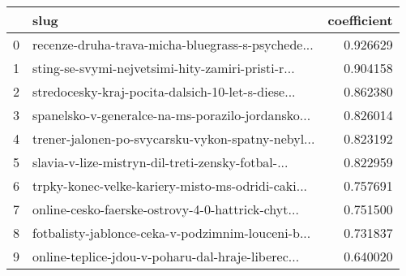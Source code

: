 \begin{tabular}{llr}
\toprule
{} &                                               slug &  coefficient \\
\midrule
0 &  recenze-druha-trava-micha-bluegrass-s-psychede... &     0.926629 \\
1 &  sting-se-svymi-nejvetsimi-hity-zamiri-pristi-r... &     0.904158 \\
2 &  stredocesky-kraj-pocita-dalsich-10-let-s-diese... &     0.862380 \\
3 &  spanelsko-v-generalce-na-ms-porazilo-jordansko... &     0.826014 \\
4 &  trener-jalonen-po-svycarsku-vykon-spatny-nebyl... &     0.823192 \\
5 &  slavia-v-lize-mistryn-dil-treti-zensky-fotbal-... &     0.822959 \\
6 &  trpky-konec-velke-kariery-misto-ms-odridi-caki... &     0.757691 \\
7 &  online-cesko-faerske-ostrovy-4-0-hattrick-chyt... &     0.751500 \\
8 &  fotbalisty-jablonce-ceka-v-podzimnim-louceni-b... &     0.731837 \\
9 &  online-teplice-jdou-v-poharu-dal-hraje-liberec... &     0.640020 \\
\bottomrule
\end{tabular}
